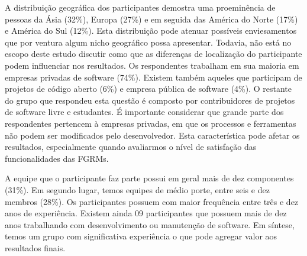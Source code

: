 A distribuição geográfica dos participantes demostra uma proeminência de pessoas
da Ásia (32\%), Europa (27\%) e em seguida das América do Norte (17\%) e América
do Sul (12\%). Esta distribuição pode atenuar possíveis enviesamentos que por
ventura algum nicho geográfico possa apresentar. Todavia, não está no escopo
deste estudo discutir como que as diferenças de localização do participante
podem influenciar nos resultados. Os respondentes trabalham em sua maioria em
empresas privadas de software (74\%). Existem também aqueles que participam de
projetos de código aberto (6\%) e empresa pública de software (4\%). O restante
do grupo que respondeu esta questão é composto por contribuidores de projetos
de software livre e estudantes. É importante considerar que grande parte dos
respondentes pertencem à empresas privadas, em que os processos e ferramentas
não podem ser modificados pelo desenvolvedor. Esta característica pode afetar
os resultados, especialmente quando avaliarmos o nível de satisfação das
funcionalidades das FGRMs.




A equipe que o participante faz parte possui em geral mais de dez componentes
(31\%). Em segundo lugar, temos equipes de médio porte, entre seis e dez membros
(28\%). Os participantes possuem com maior frequência entre três e dez anos de
experiência. Existem ainda 09 participantes que possuem mais de dez anos
trabalhando com desenvolvimento ou manutenção de software. Em síntese, temos um
grupo com significativa experiência o que pode agregar valor aos resultados
finais.



